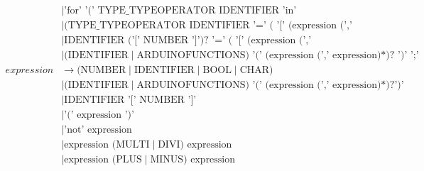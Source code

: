 \begin{align*}
                & \mid \text{'for' '(' TYPE\_TYPEOPERATOR IDENTIFIER 'in' IDENTIFIER ')' statement}                                                                                           \\ %
                & \mid \text{(TYPE\_TYPEOPERATOR IDENTIFIER '=' ( '[' (expression (',' expression)*)? ']' | expression) ';') }                                                                \\ %
                & \mid \text{IDENTIFIER ('[' NUMBER ']')? '=' ( '[' (expression (',' expression)*)? ']' | expression) ';}                                                                     \\ %
                & \mid \text{(IDENTIFIER} \mid \text{ARDUINOFUNCTIONS) '(' (expression (',' expression)*)? ')' ';' }                                                                          \\ %
    expression  & \to \text{(NUMBER} \mid \text{IDENTIFIER} \mid \text{BOOL} \mid \text{CHAR)}                                                                                                \\ %
                & \mid \text{(IDENTIFIER} \mid \text{ARDUINOFUNCTIONS) '(' (expression (',' expression)*)?')'}                                                                                \\ %
                & \mid \text{IDENTIFIER '[' NUMBER ']'}                                                                                                                                       \\ %
                & \mid \text{'(' expression ')'}                                                                                                                                              \\ %
                & \mid \text{'not' expression}                                                                                                                                                \\ %
                & \mid \text{expression (MULTI} \mid \text{DIVI) expression}                                                                                                                  \\ %
                & \mid \text{expression (PLUS} \mid \text{MINUS) expression}                                                                                                                  \\ %

\end{align*}
